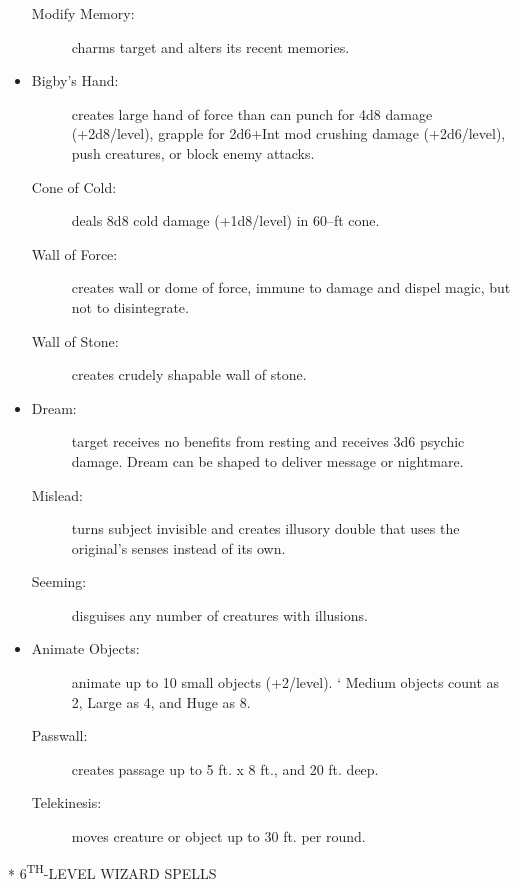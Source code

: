 \documentclass[DIV=14, paper=a4, fontsize=10pt, twocolumn, twoside]{scrartcl}
\makeatletter
\let\origsection\section
\renewcommand\section{\@ifstar{\starsection}{\nostarsection}}
\newcommand\nostarsection[1]
{\origsection{#1}\vspace{-0.5em}}
\newcommand\starsection[1]
{\vspace{-0.5cm}\origsection*{#1}\vspace{-0.3cm}}
\newcommand\invisiblesection[1]{%
  \refstepcounter{section}%
  \sectionmark{#1}
}
\newcommand\listsection[2]{%
	\invisiblesection{#2}
	\section*{\color{dndblue} #1}
}
\renewcommand\thesection{}
\makeatother
\begin{document}
\begin{itemize}[align=parleft,labelwidth=1cm]
\begin{description}
 \item[Modify Memory:] charms target and alters its recent memories.
\end{description}
\renewcommand{\labelitemi}{Evoc}\item
\begin{description}
 \item[Bigby’s Hand:] creates large hand of force than can punch for 4d8 damage (+2d8/level), grapple for 2d6+Int mod crushing damage (+2d6/level), push creatures, or block enemy attacks.
 \item[Cone of Cold:] deals 8d8 cold damage (+1d8/level) in 60–ft cone.
 \item[Wall of Force:] creates wall or dome of force, immune to damage and dispel magic, but not to disintegrate.
 \item[Wall of Stone:] creates crudely shapable wall of stone.
\end{description}
\renewcommand{\labelitemi}{Illus}\item
\begin{description}
 \item[Dream:] target receives no benefits from resting and receives 3d6 psychic damage. Dream can be shaped to deliver message or nightmare.
 \item[Mislead:] turns subject invisible and creates illusory double that uses the original’s senses instead of its own.
 \item[Seeming:] disguises any number of creatures with illusions.
\end{description}
\renewcommand{\labelitemi}{Trans}\item
\begin{description}
 \item[Animate Objects:] animate up to 10 small objects (+2/level). ‘ Medium objects count as 2, Large as 4, and Huge as 8.
 \item[Passwall:] creates passage up to 5 ft. x 8 ft., and 20 ft. deep.
 \item[Telekinesis:] moves creature or object up to 30 ft. per round.
\end{description}
\end{itemize}

\listsection{\color{dndblue}6\textsuperscript{TH}-LEVEL WIZARD SPELLS}{LEVEL 6}
\end{document}
